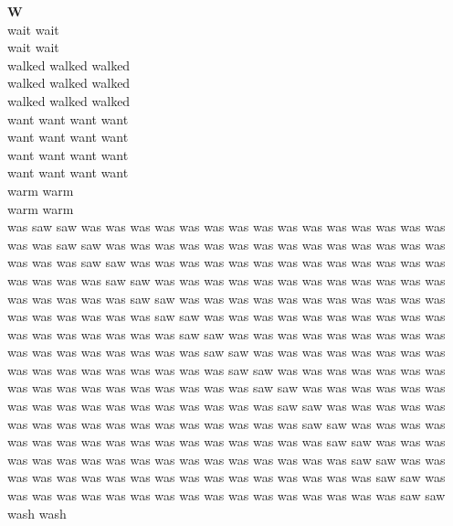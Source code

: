 \vspace{14pt}
\noindent\textbf{\Large W}\\[+12pt]
wait wait\\
wait wait\\
walked walked walked\\
walked walked walked\\
walked walked walked\\
want want want want\\
want want want want\\
want want want want\\
want want want want\\
warm warm\\
warm warm\\
was saw saw was was was was was was was was was was was was was was was\\
was was saw saw was was was was was was was was was was was was was was\\
was was was saw saw was was was was was was was was was was was was was\\
was was was was saw saw was was was was was was was was was was was was\\
was was was was was saw saw was was was was was was was was was was was\\
was was was was was was saw saw was was was was was was was was was was\\
was was was was was was was saw saw was was was was was was was was was\\
was was was was was was was was saw saw was was was was was was was was\\
was was was was was was was was was saw saw was was was was was was was\\
was was was was was was was was was was saw saw was was was was was was\\
was was was was was was was was was was was saw saw was was was was was\\
was was was was was was was was was was was was saw saw was was was was\\
was was was was was was was was was was was was was saw saw was was was\\
was was was was was was was was was was was was was was saw saw was was\\
was was was was was was was was was was was was was was was saw saw was\\
was was was was was was was was was was was was was was was was saw saw\\
wash wash\\
